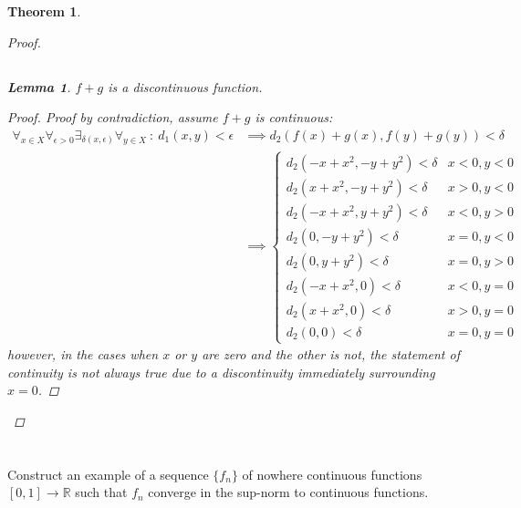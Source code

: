 \documentclass[]{article}
\newcommand{\R}{\mathbb{R}}
\newcommand{\st}{\ : \ }
\newtheorem{theorem}{Theorem}
\newtheorem{lemma}{Lemma}
\begin{document}
\begin{theorem}
\begin{proof}
        \subsection{}
        \begin{lemma}
            $f + g$ is a discontinuous function.
            \begin{proof}
                Proof by contradiction, assume $f + g$ is continuous:
                \begin{align*}
                    \forall_{x \in X} \forall_{\epsilon > 0} \exists_{\delta(x, \epsilon)} \forall_{y \in X} \st d_1(x,y) < \epsilon
                        &\implies d_2(f(x) + g(x), f(y) + g(y)) < \delta\\
                        &\implies 
                        \begin{cases}
                            d_2(-x + x^2, -y + y^2) < \delta &x < 0, y < 0\\
                            d_2(x + x^2, -y + y^2) < \delta & x > 0, y < 0\\
                            d_2(-x + x^2, y + y^2) < \delta & x < 0, y > 0\\
                            d_2(0, -y + y^2) < \delta & x= 0, y <0\\
                            d_2(0, y + y^2) < \delta & x = 0, y > 0\\
                            d_2(-x + x^2, 0) < \delta & x < 0, y = 0\\
                            d_2(x + x^2, 0) < \delta & x > 0, y = 0\\
                            d_2(0, 0) < \delta & x = 0, y = 0
                        \end{cases}
                \end{align*}
                however, in the cases when $x$ or $y$ are zero and the other is not, the statement of continuity is not always true due to a discontinuity immediately surrounding $x = 0$.
            \end{proof}
        \end{lemma}
    \end{proof}
\end{theorem}




\newpage
\section{}
Construct an example of a sequence $\{f_n\}$ of nowhere continuous functions $[0,1] \to \R$ such that $f_n$ converge in the sup-norm to continuous functions.
\end{document}
